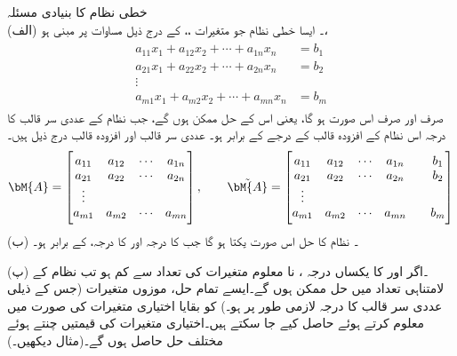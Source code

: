\quad خطی نظام کا بنیادی مسئلہ\\
(الف) ۔ ایسا خطی نظام جو  متغیرات ،، کے درج ذیل  مساوات پر مبنی ہو،
\begin{gather}
\begin{aligned}\label{مساوات_الجبرا_نظام_وجودیت_یکتائی_حل_الف}
a_{11}x_1+a_{12}x_2+\cdots+a_{1n}x_n&=b_1\\
a_{21}x_1+a_{22}x_2+\cdots+a_{2n}x_n&=b_2\\
\vdots\\
a_{m1}x_1+a_{m2}x_2+\cdots+a_{mn}x_n&=b_m
\end{aligned}
\end{gather}
صرف اور صرف اس صورت  ہو گا، یعنی اس کے حل ممکن ہوں گے، جب  نظام کے عددی سر قالب  کا درجہ اس نظام کے افزودہ قالب  کے درجے کے برابر ہو۔ عددی سر قالب اور افزودہ قالب درج ذیل ہیں۔
\begin{align*}
\bM{A}=
\begin{bmatrix} 
a_{11}&a_{12}&\cdots & a_{1n}\\
a_{21}&a_{22}&\cdots & a_{2n}\\
\vdots\\
a_{m1}&a_{m2}&\cdots & a_{mn}
\end{bmatrix},\quad \quad \tilde{\bM{A}}=
\begin{bmatrix} 
a_{11}&a_{12}&\cdots & a_{1n}&& b_1\\
a_{21}&a_{22}&\cdots & a_{2n}&& b_2\\
\vdots\\
a_{m1}&a_{m2}&\cdots & a_{mn}&&b_m
\end{bmatrix}
\end{align*}
(ب) ۔ نظام  کا حل اس صورت یکتا ہو گا جب  کا درجہ اور  کا درجہ،  کے برابر ہو۔ 

(پ) ۔اگر  اور  کا یکساں درجہ ، نا معلوم متغیرات کی تعداد  سے کم ہو تب نظام  کے لامتناہی تعداد میں حل ممکن ہوں گے۔ایسے تمام حل،  موزوں متغیرات (جس کے ذیلی عددی سر قالب کا درجہ لازمی طور پر ہو۔) کو بقایا  اختیاری متغیرات  کی صورت میں معلوم کرتے ہوئے حاصل کیے جا سکتے ہیں۔اختیاری متغیرات کی قیمتیں چنتے ہوئے مختلف حل حاصل ہوں گے۔(مثال  دیکھیں۔)

